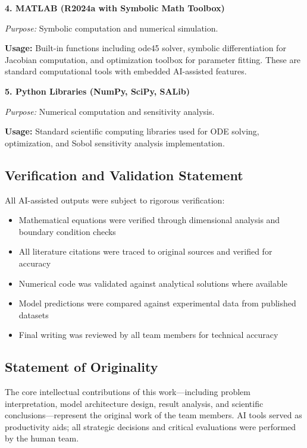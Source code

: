 \noindent\textbf{4. MATLAB (R2024a with Symbolic Math Toolbox)}

\noindent\textit{Purpose:} Symbolic computation and numerical simulation.

\noindent\textbf{Usage:} Built-in functions including ode45 solver, symbolic differentiation for Jacobian computation, and optimization toolbox for parameter fitting. These are standard computational tools with embedded AI-assisted features.

\vspace{1em}

\noindent\textbf{5. Python Libraries (NumPy, SciPy, SALib)}

\noindent\textit{Purpose:} Numerical computation and sensitivity analysis.

\noindent\textbf{Usage:} Standard scientific computing libraries used for ODE solving, optimization, and Sobol sensitivity analysis implementation.

\vspace{1.5em}

\subsection*{Verification and Validation Statement}

All AI-assisted outputs were subject to rigorous verification:
\begin{itemize}[noitemsep]
    \item Mathematical equations were verified through dimensional analysis and boundary condition checks
    \item All literature citations were traced to original sources and verified for accuracy
    \item Numerical code was validated against analytical solutions where available
    \item Model predictions were compared against experimental data from published datasets
    \item Final writing was reviewed by all team members for technical accuracy
\end{itemize}

\subsection*{Statement of Originality}

The core intellectual contributions of this work---including problem interpretation, model architecture design, result analysis, and scientific conclusions---represent the original work of the team members. AI tools served as productivity aids; all strategic decisions and critical evaluations were performed by the human team.
